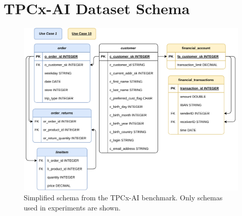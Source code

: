 \chapter{TPCx-AI Dataset Schema}

\begin{figure}[ht]
    \centering
    \includegraphics[width=0.99\linewidth]{appendices/figures/tpc-ai-schema.pdf}
    \caption[Simplified schema from the TPCx-AI\cite{tpcx-ai} benchmark]{Simplified schema from the TPCx-AI\cite{tpcx-ai} benchmark. Only schemas used in experiments are shown.}
    \label{fig:appendix-tpc-ai-schema}
\end{figure}